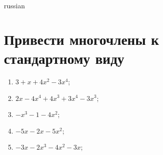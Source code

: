 \documentclass[a4paper]{article}
\begin{document}
\begin{otherlanguage*}{russian}

\section{Привести многочлены к стандартному виду}
\begin{enumerate}
\item $3 + x + 4x^{2} - 3x^{4}$;
\item $2x - 4x^{4} + 4x^{3} + 3x^{4} - 3x^{3}$;
\item $-x^{3} - 1 - 4x^{2}$;
\item $-5x - 2x - 5x^{2}$;
\item $-3x - 2x^{3} - 4x^{2} - 3x$;
\end{enumerate}
\end{otherlanguage*}
\end{document}
